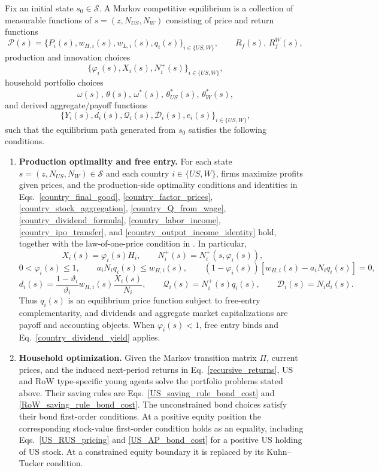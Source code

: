 \documentclass{article}
\def\green#1{#1}%
\begin{document}
\begin{defi}\label{def_recursive_equilibrium}
Fix an initial state $s_0\in\mathcal S$. A Markov competitive equilibrium is a collection of measurable functions of $s=(z,N_{US},N_W)$ consisting of price and return functions
\[
\mathcal P(s)=
\{P_i(s),w_{H,i}(s),w_{L,i}(s),q_i(s)\}_{i\in\{US,W\}},
\qquad
R_f(s),\,R_f^W(s),
\]
production and innovation choices
\[
\{\varphi_i(s),X_i(s),N_i^+(s)\}_{i\in\{US,W\}},
\]
household portfolio choices
\[
\omega(s),\,\theta(s),\,\omega^*(s),\,\theta_{US}^*(s),\,\theta_W^*(s),
\]
and derived aggregate/payoff functions
\[
\{Y_i(s),d_i(s),\mathcal Q_i(s),\mathcal D_i(s),e_i(s)\}_{i\in\{US,W\}},
\]
such that the equilibrium path generated from $s_0$ satisfies the following conditions.

\begin{enumerate}
    \item \textbf{Production optimality and free entry.} For each state $s=(z,N_{US},N_W)\in\mathcal S$ and each country $i\in\{US,W\}$, firms maximize profits given prices, and the production-side optimality conditions and identities in Eqs.~\eqref{country_final_good}, \eqref{country_factor_prices}, \eqref{country_stock_aggregation}, \eqref{country_Q_from_wage}, \eqref{country_dividend_formula}, \eqref{country_labor_income}, \eqref{country_ipo_transfer}, and \eqref{country_output_income_identity} hold, together with the law-of-one-price condition in . In particular,
    \[
    X_i(s)=\varphi_i(s)H_i,
    \qquad
    N_i^+(s)=N_i^+(s,\varphi_i(s)),
    \]
    \[
    \green{0<\varphi}_\green{i}(\green{s})\green{\le1},
    \qquad
    a_iN_iq_i(s)\green{\le} w_{H,i}(s),
    \qquad
    (\green{1-\varphi}_\green{i}(\green{s}))
    [\green{w}_{\green{H},\green{i}}(\green{s})\green{-a}_\green{iN}_\green{iq}_\green{i}(\green{s})]\green{=0},
    \]
    \[
    d_i(s)=
    \frac{1-\vartheta_i}{\vartheta_i}
    w_{H,i}(s)\frac{X_i(s)}{N_i},
    \qquad
    \mathcal Q_i(s)=N_i^+(s)q_i(s),
    \qquad
    \mathcal D_i(s)=N_id_i(s).
    \]
    Thus $q_i(s)$ is an equilibrium price function subject to \green{free-entry complementarity}, and dividends and aggregate market capitalizations are payoff and accounting objects.  \green{When} $\green{\varphi}_\green{i}(\green{s})\green{<1}$, \green{free entry binds and Eq}.~\green{\eqref{country_dividend_yield} applies}.

    \item \textbf{Household optimization.} Given the Markov transition matrix $\Pi$, current prices, and the induced next-period returns in Eq.~\eqref{recursive_returns}, US and RoW type-specific young agents solve the portfolio problems stated above. Their saving rules are Eqs.~\eqref{US_saving_rule_bond_cost} and \eqref{RoW_saving_rule_bond_cost}.  \green{The unconstrained bond} choices \green{satisfy} their \green{bond} first-order conditions.  \green{At a positive equity position the corresponding stock-value first-order condition holds as an equality}, \green{including} Eqs.~\green{\eqref{US_RUS_pricing}} and \eqref{US_AP_bond_cost} \green{for a positive US holding of US} stock.  At a constrained equity boundary \green{it} is replaced by its Kuhn--Tucker condition.


\end{enumerate}
\end{defi}
\end{document}
